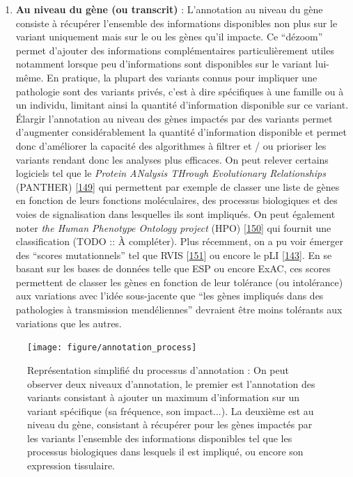 \documentclass[12pt,twoside]{ugathesis}
\providecommand{\tightlist}{%
  \setlength{\itemsep}{0pt}\setlength{\parskip}{0pt}}
\theoremstyle{definition}
\theoremstyle{definition}
\theoremstyle{remark}
\begin{document}
\begin{enumerate}
\def\labelenumi{\arabic{enumi}.}
\setcounter{enumi}{1}
\tightlist
\item
  \textbf{Au niveau du gène (ou transcrit)} : L'annotation au niveau du
  gène consiste à récupérer l'ensemble des informations disponibles non
  plus sur le variant uniquement mais sur le ou les gènes qu'il impacte.
  Ce ``dézoom'' permet d'ajouter des informations complémentaires
  particulièrement utiles notamment lorsque peu d'informations sont
  disponibles sur le variant lui-même. En pratique, la plupart des
  variants connus pour impliquer une pathologie sont des variants
  privés, c'est à dire spécifiques à une famille ou à un individu,
  limitant ainsi la quantité d'information disponible sur ce variant.
  Élargir l'annotation au niveau des gènes impactés par des variants
  permet d'augmenter considérablement la quantité d'information
  disponible et permet donc d'améliorer la capacité des algorithmes à
  filtrer et / ou prioriser les variants rendant donc les analyses plus
  efficaces. On peut relever certains logiciels tel que le \emph{Protein
  ANalysis THrough Evolutionary Relationships} (PANTHER)
  {[}\protect\hyperlink{ref-Mi2017}{149}{]} qui permettent par exemple
  de classer une liste de gènes en fonction de leurs fonctions
  moléculaires, des processus biologiques et des voies de signalisation
  dans lesquelles ils sont impliqués. On peut également noter \emph{the
  Human Phenotype Ontology project} (HPO)
  {[}\protect\hyperlink{ref-Kohler2014}{150}{]} qui fournit une
  classification (TODO :: À compléter). Plus récemment, on a pu voir
  émerger des ``scores mutationnels'' tel que RVIS
  {[}\protect\hyperlink{ref-Petrovski2013}{151}{]} ou encore le pLI
  {[}\protect\hyperlink{ref-Lek2016}{143}{]}. En se basant sur les bases
  de données telle que ESP ou encore ExAC, ces scores permettent de
  classer les gènes en fonction de leur tolérance (ou intolérance) aux
  variations avec l'idée sous-jacente que ``les gènes impliqués dans des
  pathologies à transmission mendéliennes'' devraient être moins
  tolérants aux variations que les autres.
\end{enumerate}

\begin{figure}

{\centering \texttt{[image: figure/annotation\_process]} 

}

\caption[Représentation simplifié du processus d'annotation]{Représentation simplifié du processus d'annotation : On peut observer deux niveaux d'annotation, le premier est l'annotation des variants consistant à ajouter un maximum d'information sur un variant spécifique (sa fréquence, son impact...). La deuxième est au niveau du gène, consistant à récupérer pour les gènes impactés par les variants l'ensemble des informations disponibles tel que les processus biologiques dans lesquels il est impliqué, ou encore son expression tissulaire.}\label{fig:pictannot}
\end{figure}
\end{document}
